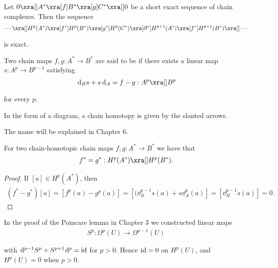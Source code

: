 \begin{theorem}\label{theorem:4-9}
Let $0\xra[]A^*\xra[f]B^*\xra[g]C^*\xra[]0$ be a short exact sequence of chain complexes. Then the sequence
\begin{align*}
  \cdots\xra[]H^p(A^*)\xra[f^*]H^p(B^*)\xra[g^*]H^p(C^*)\xra[\partial^*]H^{p+1}(A^*)\xra[f^*]H^{p+1}(B^*)\xra[] \cdots
\end{align*}

is exact.
\end{theorem}


\begin{definition}\label{def:4-10}
  Two chain maps $f, g:A^*\to B^*$ are said to be  if there exists a linear map
$s:A^p\to B^{p-1}$ satisfying
\begin{align*}
  \dd_{B}s + s\dd_A = f - g: A^p\xra[]B^p
\end{align*}

for every $p$.
\end{definition}

In the form of a diagram, a chain homotopy is given by the slanted arrows.
\begin{center}
\end{center}


The name  will be explained in Chapter 6.


\begin{lemma}\label{lemma:4-11}
  For two chain-homotopic chain maps $f,g:A^*\to B^*$ we have that
  \begin{align*}
    f^* = g^*: H^p(A^*)\xra[]H^p(B^*).
  \end{align*}
\end{lemma}

\begin{proof}
  If $[a]\in H^p(A^*)$, then 
  \begin{align*}
    (f^* - g^*)[a] = [f^p(a) - g^p(a)] = [(\dd_B^{p-1}s(a) + s\dd^p_A(a)] 
    = [\dd^{p-1}_Bs(a)] 
    = 0.
  \end{align*}
\end{proof}


\begin{remark}\label{remark:4-12}
  In the proof of the Poincare lemma in Chapter 3 we constructed
linear maps
\begin{align*}
  S^p: \Omega^p(U)\to\Omega^{p-1}(U)
\end{align*}

with $\dd^{p-1}S^p + S^{p+1}\dd^p = \id$ for $p>0$. Hence $\operatorname{id}=0$ on $H^p(U)$, and $H^p(U) = 0$
when $p>0$.
\end{remark}

